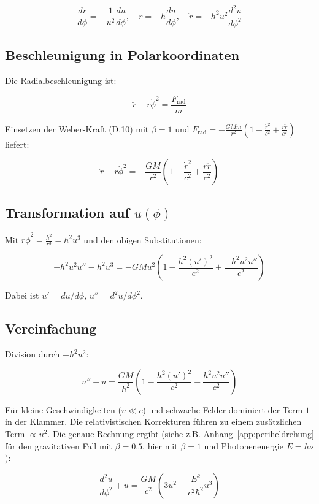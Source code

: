 \[
\frac{dr}{d\phi} = -\frac{1}{u^2} \frac{du}{d\phi}, \quad
\dot{r} = -h \frac{du}{d\phi}, \quad
\ddot{r} = -h^2 u^2 \frac{d^2u}{d\phi^2}
\]

\subsection{Beschleunigung in Polarkoordinaten}
\label{sub:herleitungen_licht_beschl}

Die Radialbeschleunigung ist:

\[
\ddot{r} - r\dot{\phi}^2 = \frac{F_{\text{rad}}}{m}
\]

Einsetzen der Weber-Kraft (D.10) mit \(\beta = 1\) und \(F_{\text{rad}} = -\frac{GMm}{r^2}\left(1 - \frac{\dot{r}^2}{c^2} + \frac{r\ddot{r}}{c^2}\right)\) liefert:

\[
\ddot{r} - r\dot{\phi}^2 = -\frac{GM}{r^2} \left(1 - \frac{\dot{r}^2}{c^2} + \frac{r\ddot{r}}{c^2}\right)
\]

\subsection{Transformation auf \(u(\phi)\)}
\label{sub:herleitungen_licht_trans}

Mit \(r\dot{\phi}^2 = \frac{h^2}{r^3} = h^2 u^3\) und den obigen Substitutionen:

\[
-h^2 u^2 u'' - h^2 u^3 = -GM u^2 \left(1 - \frac{h^2 (u')^2}{c^2} + \frac{-h^2 u^2 u''}{c^2}\right)
\]

Dabei ist \(u' = du/d\phi\), \(u'' = d^2u/d\phi^2\).

\subsection{Vereinfachung}
\label{sub:herleitungen_licht_vereinf}

Division durch \(-h^2 u^2\):

\[
u'' + u = \frac{GM}{h^2} \left(1 - \frac{h^2 (u')^2}{c^2} - \frac{h^2 u^2 u''}{c^2}\right)
\]

Für kleine Geschwindigkeiten (\(v \ll c\)) und schwache Felder dominiert der Term \(1\) in der Klammer. Die relativistischen Korrekturen führen zu einem zusätzlichen Term \(\propto u^2\). Die genaue Rechnung ergibt (siehe z.B. Anhang~\ref{app:periheldrehung} für den gravitativen Fall mit \(\beta = 0.5\), hier mit \(\beta = 1\) und Photonenenergie \(E = h\nu\)):

\[
\frac{d^2u}{d\phi^2} + u = \frac{GM}{c^2} \left(3u^2 + \frac{E^2}{c^2 \hbar^2} u^3\right) \tag{D.11}
\]

